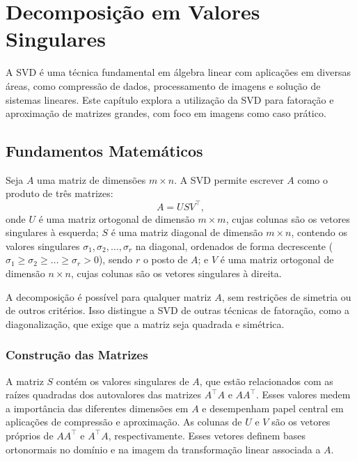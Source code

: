 \chapter{Decomposição em Valores Singulares}

A SVD é uma técnica fundamental em álgebra linear com aplicações em diversas áreas, como compressão de dados, processamento de imagens e solução de sistemas lineares. Este capítulo explora a utilização da SVD para fatoração e aproximação de matrizes grandes, com foco em imagens como caso prático.

\section{Fundamentos Matemáticos}

Seja \( A \) uma matriz de dimensões \( m \times n \). A SVD permite escrever \( A \) como o produto de três matrizes:
\begin{equation}
  A = U S V^\top,
\end{equation}
onde \( U \) é uma matriz ortogonal de dimensão \( m \times m \), cujas colunas são os vetores singulares à esquerda; \( S \) é uma matriz diagonal de dimensão \( m \times n \), contendo os valores singulares \( \sigma_1, \sigma_2, \dots, \sigma_r \) na diagonal, ordenados de forma decrescente (\( \sigma_1 \geq \sigma_2 \geq \dots \geq \sigma_r > 0 \)), sendo \( r \) o posto de \( A \); e \( V \) é uma matriz ortogonal de dimensão \( n \times n \), cujas colunas são os vetores singulares à direita.

A decomposição é possível para qualquer matriz \( A \), sem restrições de simetria ou de outros critérios. Isso distingue a SVD de outras técnicas de fatoração, como a diagonalização, que exige que a matriz seja quadrada e simétrica.

\subsection{Construção das Matrizes}

A matriz \( S \) contém os valores singulares de \( A \), que estão relacionados com as raízes quadradas dos autovalores das matrizes \( A^\top A \) e \( A A^\top \). Esses valores medem a importância das diferentes dimensões em \( A \) e desempenham papel central em aplicações de compressão e aproximação. As colunas de \( U \) e \( V \) são os vetores próprios de \( A A^\top \) e \( A^\top A \), respectivamente. Esses vetores definem bases ortonormais no domínio e na imagem da transformação linear associada a \( A \).

